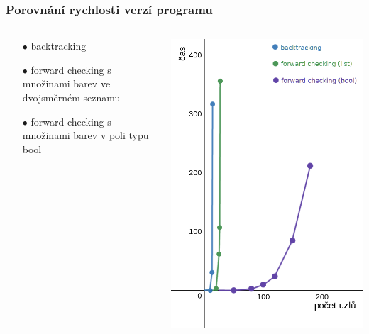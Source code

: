 \documentclass[10pt,xcolor=pdflatex]{beamer}
\begin{document}
\begin{frame}\frametitle{Porovnání rychlosti verzí programu}

    \begin{columns}
    \begin{column}{0.5\textwidth}
        \begin{itemize}
        \item[$\bullet$] backtracking
        \item[$\bullet$] forward checking s množinami barev ve dvojsměrném seznamu 
        \item[$\bullet$] forward checking s množinami barev v poli typu bool
        \end{itemize}
    \end{column}
    \begin{column}{0.5\textwidth}
        \begin{center}
         \includegraphics[scale=0.2]{img/compare_alg.png}
         \end{center}
    \end{column}
    \end{columns}
\end{frame}
\end{document}
